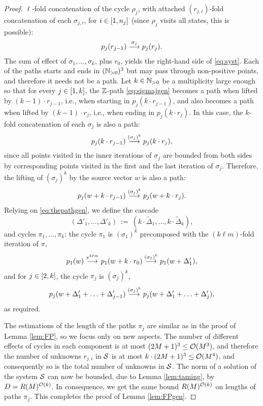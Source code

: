 \begin{appendixproof}
\begin{proof}
$\ell$-fold concatenation of the cycle $\rho_j$, with attached 
$(r_{j,i})$-fold concatenation of each $\sigma_{j,i}$, for $i\in [1, n_j]$
(since $\rho_j$ visits all states, this is possible):
%
\begin{align} \label{eq:sigmajgen}
p_j(r_{j-1}) \stackrel{\sigma_j}{\longrightarrow} p_j(r_j).
\end{align}
%
The sum of effect of $\sigma_1, \ldots, \sigma_k$, plus $r_0$, 
yields the right-hand side of \eqref{eq:syst}.
Each of the paths starts and ends in $(\mathbb{N}_{>0})^3$ but may pass through non-positive points, and therefore it
needs not be a path.
%
Let $k\in\mathbb{N}_{>0}$ be a multiplicity large enough so that for every $j\in [1, k]$, 
the $\mathbb{Z}$-path \eqref{eq:sigmajgen} becomes a path
when lifted by $(k-1) \cdot r_{j-1}$,
i.e., when starting in $p_j(k \cdot r_{j-1})$, 
and also becomes a path when lifted by $(k-1)\cdot r_j$, i.e., when
ending in 
$p_j(k \cdot r_j)$.
%
In this case, the $k$-fold concatenation of each $\sigma_j$ is also a path:
%
\[
p_j(k\cdot r_{j-1}) \stackrel{(\sigma_j)^k}{\longrightarrow} p_j(k \cdot r_j),
\]
since all points visited in the inner iterations of $\sigma_j$ are bounded 
from both sides by corresponding points visited in the first and the last iteration of $\sigma_j$.
Therefore, the lifting of $(\sigma_j)^k$ by the source vector $w$ is also a path:
%
\begin{align} \label{eq:thepathgen}
p_j(w+k\cdot r_{j-1}) \stackrel{(\sigma_j)^k}{\longrightarrow} p_j(w+k \cdot r_j).
\end{align}
%
Relying on \eqref{eq:thepathgen},
we define the cascade
\[
(\Delta'_1, \ldots, \Delta'_k) \ := \ (k \cdot \widetilde\Delta_1, \ldots, k \cdot \widetilde\Delta_k),
\]
and cycles $\pi_1, \ldots, \pi_k$:
the cycle $\pi_1$ is  $(\sigma_1)^k$ precomposed with the $(k\ell m)$-fold iteration
of $\pi$,
\[
p_1(w) \stackrel{\pi^{k\ell m}}{\longrightarrow} p_1(w + k\cdot r_0) \stackrel{(\sigma_1)^k}{\longrightarrow} p_1(w + \Delta'_1),
\]
and for $j\in[2, k]$, the cycle $\pi_j$ is $(\sigma_j)^k$,
\[
p_j(w + \Delta'_1 + \ldots + \Delta'_{j-1}) \stackrel{(\sigma_j)^k}{\longrightarrow}
p_j(w + \Delta'_1 + \ldots + \Delta'_{j}),
\]
as required.


The estimations of the length of the paths $\pi_j$ are similar as in the proof of Lemma \ref{lem:FP},
so we focus only on new aspects.
The number of different effects of cycles in each component is at most $(2M+1)^3\leq {\cal O}(M^3)$, 
and therefore
the number of unknowns $r_{j,i}$ in $\cal S$
is at most $k\cdot (2M+1)^3 \leq {\cal O}(M^4)$, and consequently so is the 
total number of unknowns in $\cal S$.
The norm of a solution of the system $\cal S$ can now be bounded, due to Lemma \ref{lem:taming},
by $D = R(M)^{{\cal O}(k)}$.
In consequence, we get the same bound $R(M)^{{\cal O}(k)}$ on lengths of paths $\pi_j$.
This completes
the proof of Lemma  \ref{lem:FPgen}.
\end{proof}


\end{appendixproof}
